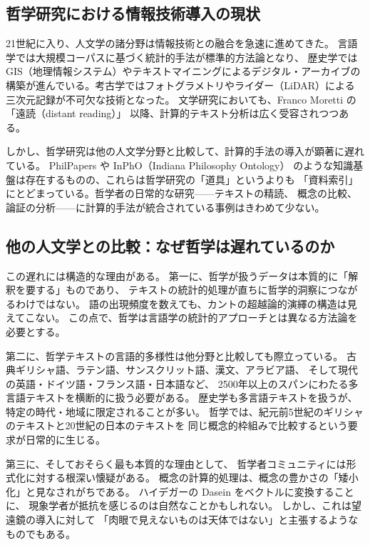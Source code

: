 \documentclass[a4paper,11pt]{ltjsarticle}
\begin{document}
\subsection{哲学研究における情報技術導入の現状}

21世紀に入り、人文学の諸分野は情報技術との融合を急速に進めてきた。
言語学では大規模コーパスに基づく統計的手法が標準的方法論となり、
歴史学では GIS（地理情報システム）やテキストマイニングによるデジタル・アーカイブの
構築が進んでいる。考古学ではフォトグラメトリやライダー（LiDAR）による
三次元記録が不可欠な技術となった。
文学研究においても、Franco Moretti の「遠読（distant reading）」\cite{moretti2013}
以降、計算的テキスト分析は広く受容されつつある。

しかし、哲学研究は他の人文学分野と比較して、計算的手法の導入が顕著に遅れている。
PhilPapers\cite{bourget2014} や InPhO（Indiana Philosophy Ontology）\cite{niepert2008}
のような知識基盤は存在するものの、これらは哲学研究の「道具」というよりも
「資料索引」にとどまっている。哲学者の日常的な研究——テキストの精読、
概念の比較、論証の分析——に計算的手法が統合されている事例はきわめて少ない。

\subsection{他の人文学との比較：なぜ哲学は遅れているのか}

この遅れには構造的な理由がある。
第一に、哲学が扱うデータは本質的に「解釈を要する」ものであり、
テキストの統計的処理が直ちに哲学的洞察につながるわけではない。
語の出現頻度を数えても、カントの超越論的演繹の構造は見えてこない。
この点で、哲学は言語学の統計的アプローチとは異なる方法論を必要とする。

第二に、哲学テキストの言語的多様性は他分野と比較しても際立っている。
古典ギリシャ語、ラテン語、サンスクリット語、漢文、アラビア語、
そして現代の英語・ドイツ語・フランス語・日本語など、
2500年以上のスパンにわたる多言語テキストを横断的に扱う必要がある。
歴史学も多言語テキストを扱うが、特定の時代・地域に限定されることが多い。
哲学では、紀元前5世紀のギリシャのテキストと20世紀の日本のテキストを
同じ概念的枠組みで比較するという要求が日常的に生じる。

第三に、そしておそらく最も本質的な理由として、
哲学者コミュニティには形式化に対する根深い懐疑がある。
概念の計算的処理は、概念の豊かさの「矮小化」と見なされがちである。
ハイデガーの Dasein をベクトルに変換することに、
現象学者が抵抗を感じるのは自然なことかもしれない。
しかし、これは望遠鏡の導入に対して
「肉眼で見えないものは天体ではない」と主張するようなものでもある。
\end{document}
